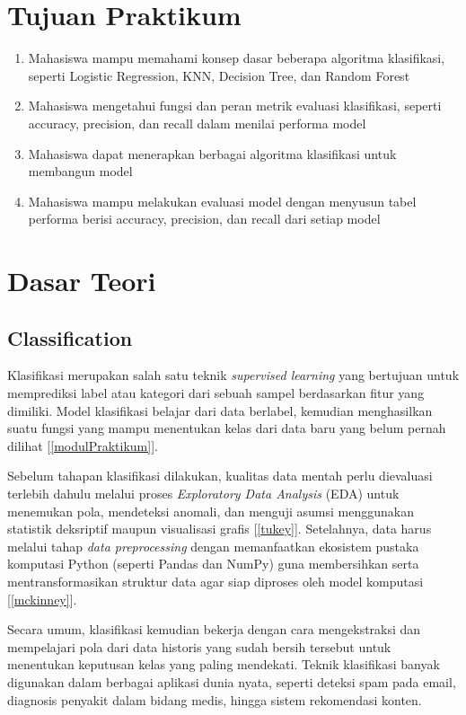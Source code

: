 \documentclass[a4paper,oneside,11pt]{book}
\begin{document}
\chapter{Tujuan Praktikum}
\begin{enumerate}
    \item Mahasiswa mampu memahami konsep dasar beberapa algoritma klasifikasi, seperti Logistic Regression, KNN, Decision Tree, dan Random Forest
    \item Mahasiswa mengetahui fungsi dan peran metrik evaluasi klasifikasi, seperti accuracy, precision, dan recall dalam menilai performa model
    \item Mahasiswa dapat menerapkan berbagai algoritma klasifikasi untuk membangun model
    \item Mahasiswa mampu melakukan evaluasi model dengan menyusun tabel performa berisi accuracy, precision, dan recall dari setiap model
\end{enumerate}

\chapter{Dasar Teori}

\section{Classification}
Klasifikasi merupakan salah satu teknik \textit{supervised learning} yang bertujuan untuk memprediksi label atau kategori dari sebuah sampel berdasarkan fitur yang dimiliki. Model klasifikasi belajar dari data berlabel, kemudian menghasilkan suatu fungsi yang mampu menentukan kelas dari data baru yang belum pernah dilihat [\ref{modulPraktikum}]. 

Sebelum tahapan klasifikasi dilakukan, kualitas data mentah perlu dievaluasi terlebih dahulu melalui proses \textit{Exploratory Data Analysis} (EDA) untuk menemukan pola, mendeteksi anomali, dan menguji asumsi menggunakan statistik deksriptif maupun visualisasi grafis [\ref{tukey}]. Setelahnya, data harus melalui tahap \textit{data preprocessing} dengan memanfaatkan ekosistem pustaka komputasi Python (seperti Pandas dan NumPy) guna membersihkan serta mentransformasikan struktur data agar siap diproses oleh model komputasi [\ref{mckinney}].

Secara umum, klasifikasi kemudian bekerja dengan cara mengekstraksi dan mempelajari pola dari data historis yang sudah bersih tersebut untuk menentukan keputusan kelas yang paling mendekati. Teknik klasifikasi banyak digunakan dalam berbagai aplikasi dunia nyata, seperti deteksi spam pada email, diagnosis penyakit dalam bidang medis, hingga sistem rekomendasi konten.
\end{document}
